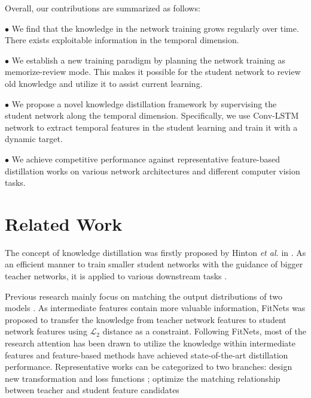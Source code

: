\documentclass[letterpaper]{article} %
\begin{document}


Overall, our contributions are summarized as follows:

$\bullet$ We find that the knowledge in the network training grows regularly over time. There exists exploitable information in the temporal dimension.

$\bullet$ We establish a new training paradigm by planning the network training as memorize-review mode. This makes it possible for the student network to review old knowledge and utilize it to assist current learning.

$\bullet$ We propose a novel knowledge distillation framework by supervising the student network along the temporal dimension. Specifically, we use Conv-LSTM network to extract temporal features in the student learning and train it with a dynamic target. 

$\bullet$ We achieve competitive performance against representative feature-based distillation works on various network architectures and different computer vision tasks.


\section{Related Work}
The concept of knowledge distillation was firstly proposed by Hinton \emph{et al.} in \cite{hinton2015distilling}. As an efficient manner to train smaller student networks with the guidance of bigger teacher networks, it is applied to various downstream tasks \cite{li2017mimicking, li2021online}.

Previous research mainly focus on matching the output distributions of two models \cite{hinton2015distilling,mirzadeh2020improved,cho2019efficacy,furlanello2018born}. As intermediate features contain more valuable information, FitNets \cite{romero2014fitnets} was proposed to transfer the knowledge from teacher network features to student network features using $\mathcal{L}_{2}$ distance as a constraint. Following FitNets, most of the research attention has been drawn to utilize the knowledge within intermediate features and feature-based methods have achieved state-of-the-art distillation performance. Representative works can be categorized to two branches: design new transformation and loss functions \cite{zagoruyko2016paying,tian2019contrastive,heo2019comprehensive}; optimize the matching relationship between teacher and student feature candidates \cite{chen2021distilling,ji2021show}
\end{document}

